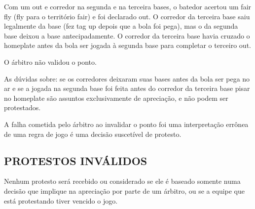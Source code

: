  \begin{exemplo}

Com um \gls{out} e corredor na segunda e na terceira bases, o batedor acertou um \gls{fair fly} (\gls{fly} para o território \gls{fair}) e foi declarado \gls{out}. O corredor da terceira  base saiu legalmente da base (fez \gls{tag up} depois que a bola foi pega), mas o da segunda base deixou a base antecipadamente. O corredor da terceira base havia cruzado o \gls{homeplate} antes da bola ser jogada à segunda base para  completar o terceiro \gls{out}.

O árbitro não validou o ponto.

\vspace{3mm}
As dúvidas sobre: se os corredores deixaram suas bases antes da bola ser pega no ar e se a jogada na  segunda base foi feita antes do corredor da terceira base pisar no \gls{homeplate} são assuntos exclusivamente de apreciação, e não podem ser protestados.

\vspace{2mm}
A  falha cometida pelo árbitro ao invalidar o ponto foi uma interpretação errônea de uma regra de jogo é uma decisão suscetível de protesto.

 \end{exemplo}


\subsection{PROTESTOS INVÁLIDOS}
 Nenhum protesto será recebido ou considerado se ele é baseado somente numa  decisão que implique na apreciação por parte de um árbitro, ou se a equipe que está protestando tiver vencido o jogo.


